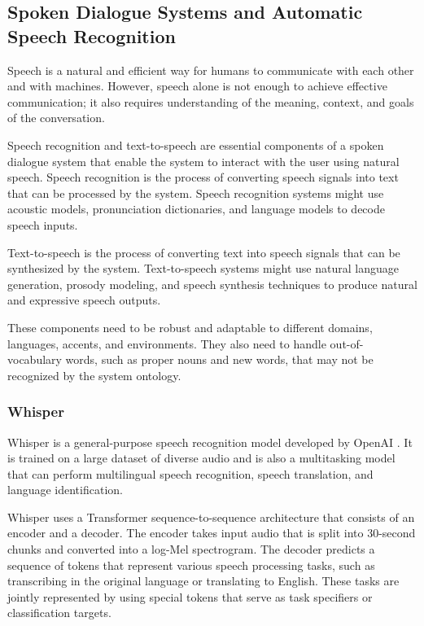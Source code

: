 \documentclass[11pt, a4paper]{amsart}
\begin{document}
\subsection{Spoken Dialogue Systems and Automatic Speech Recognition}

Speech is a natural and efficient way for humans to communicate with each other and with machines.
However, speech alone is not enough to achieve effective communication; it also requires understanding of the meaning, context, and goals of the conversation.

Speech recognition and text-to-speech are essential components of a spoken dialogue system that enable the system to interact with the user using natural speech.
Speech recognition is the process of converting speech signals into text that can be processed by the system.
Speech recognition systems might use acoustic models, pronunciation dictionaries, and language models to decode speech inputs.

Text-to-speech is the process of converting text into speech signals that can be synthesized by the system.
Text-to-speech systems might use natural language generation, prosody modeling, and speech synthesis techniques to produce natural and expressive speech outputs.

These components need to be robust and adaptable to different domains, languages, accents, and environments.
They also need to handle out-of-vocabulary words, such as proper nouns and new words, that may not be recognized by the system ontology.

\subsubsection{Whisper}

Whisper is a general-purpose speech recognition model developed by OpenAI \cite{radford2022robust}.
It is trained on a large dataset of diverse audio and is also a multitasking model that can perform multilingual speech recognition, speech translation, and language identification.

Whisper uses a Transformer sequence-to-sequence architecture that consists of an encoder and a decoder.
The encoder takes input audio that is split into 30-second chunks and converted into a log-Mel spectrogram.
The decoder predicts a sequence of tokens that represent various speech processing tasks, such as transcribing in the original language or translating to English.
These tasks are jointly represented by using special tokens that serve as task specifiers or classification targets.
\end{document}
